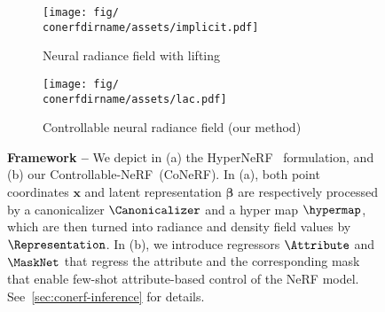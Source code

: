 \begin{figure}
  \centering
  \begin{subfigure}[b]{0.39\linewidth}
    \centering
    \texttt{[image: fig/\\conerfdirname/assets/implicit.pdf]}
    \vspace{0.0em}
    \caption{Neural radiance field with lifting~\cite{park2021hypernerf}}
    \label{fig:conerf-implicit}
  \end{subfigure}
  \hfill
  \begin{subfigure}[b]{0.60\linewidth}
    \centering
    \texttt{[image: fig/\\conerfdirname/assets/lac.pdf]}
    \caption{Controllable neural radiance field (our method)}
    \label{fig:conerf-laced-implicit}
  \end{subfigure}
  \vspace{-0.7em}
  \caption{{\bf Framework -- }
    We depict in (a) the HyperNeRF~\cite{park2021hypernerf} formulation, and
    (b) our Controllable-NeRF~(CoNeRF).
    In (a), both point coordinates $\mathbf{x}$ and latent representation
    $\boldsymbol{\beta}$ are respectively processed by a canonicalizer
    $\Canonicalizer$ and a hyper map $\hypermap$, which are then turned into
    radiance and density field values by $\Representation$.
    In (b), we introduce regressors $\Attribute$ and $\MaskNet$ that regress
    the attribute and the corresponding mask that enable few-shot
    attribute-based control of the NeRF model.
    See~\cref{sec:conerf-inference} for details.
  }
  \label{fig:conerf-pipeline}
\end{figure}